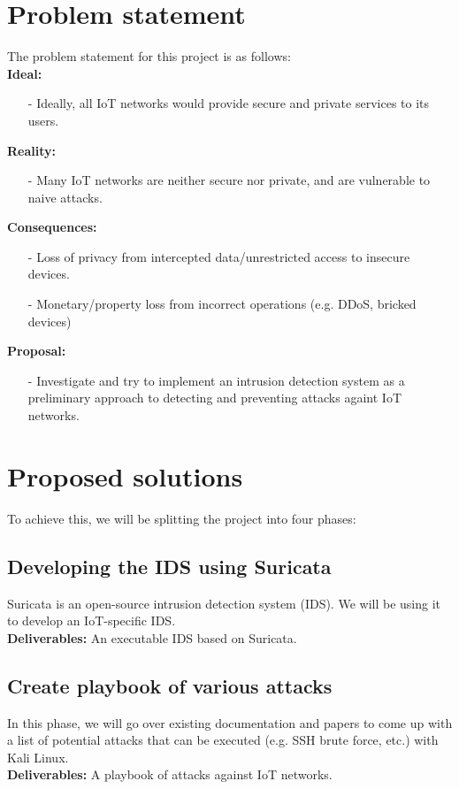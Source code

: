 \documentclass{article}
\begin{document}
\begin{multicols}{2}
\section{Problem statement}
The problem statement for this project is as follows:\\
\textbf{Ideal:}
\begin{itemize}
\item[-]{Ideally, all IoT networks would provide secure and private services to its users.}
\end{itemize}
\textbf{Reality:}
\begin{itemize}
\item[-]{Many IoT networks are neither secure nor private, and are vulnerable to naive attacks.}
\end{itemize}
\textbf{Consequences:}
\begin{itemize}
\item[-]{Loss of privacy from intercepted data/unrestricted access to insecure devices.}
\item[-]{Monetary/property loss from incorrect operations (e.g. DDoS, bricked devices)}
\end{itemize}
\textbf{Proposal:}
\begin{itemize}
\item[-]{Investigate and try to implement an intrusion detection system as a preliminary approach to detecting and preventing attacks againt IoT networks.}
\end{itemize}

\section{Proposed solutions}
To achieve this, we will be splitting the project into four phases:
\subsection{Developing the IDS using Suricata}
Suricata is an open-source intrusion detection system (IDS). We will be using it to develop an IoT-specific IDS.\\
\textbf{Deliverables:} An executable IDS based on Suricata.
\subsection{Create playbook of various attacks}
In this phase, we will go over existing documentation and papers to come up with a list of potential attacks that can be executed (e.g. SSH brute force, etc.) with Kali Linux.\\
\textbf{Deliverables:} A playbook of attacks against IoT networks.

\end{multicols}
\end{document}
